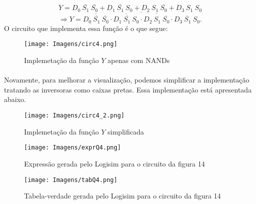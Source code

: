 \documentclass[a4paper, 12pt]{article}
\begin{document}
\[
Y = D_0 \ \overline{S_1} \ \overline{S_0} + D_1 \ \overline{S_1} \ S_0 + D_2 \ S_1 \ \overline{S_0} + D_3 \ S_1 \ S_0
\]
\[
\Rightarrow Y = \overline{\overline{D_0 \ \overline{S_1} \ \overline{S_0}} \cdot \overline{D_1 \ \overline{S_1} \ S_0} \cdot \overline{D_2 \ S_1 \ \overline{S_0}} \cdot \overline{D_3 \ S_1 \ S_0}}.
\]
O circuito que implementa essa função é o que segue:

\begin{figure}[H]
    \centering
    \texttt{[image: Imagens/circ4.png]}
    \caption{Implemetação da função $Y$ apenas com NANDs}
\end{figure}

\paragraph{}
Novamente, para melhorar a visualização, podemos simplificar a implementação tratando as inversoras como caixas pretas. Essa implementação está apresentada abaixo.

\begin{figure}[H]
    \centering
    \texttt{[image: Imagens/circ4\_2.png]}
    \caption{Implemetação da função $Y$ simplificada}
\end{figure}

\begin{figure}[H]
    \centering
    \texttt{[image: Imagens/exprQ4.png]}
    \caption{Expressão gerada pelo Logisim para o circuito da figura 14}
\end{figure}

\begin{figure}[H]
    \centering
    \texttt{[image: Imagens/tabQ4.png]}
    \caption{Tabela-verdade gerada pelo Logisim para o circuito da figura 14}
\end{figure}
\end{document}
